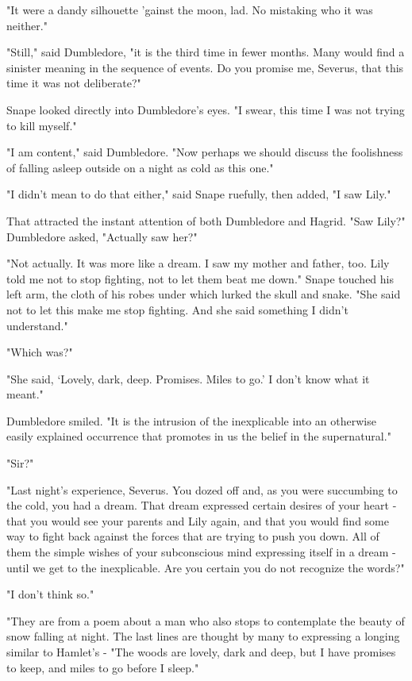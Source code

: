\documentclass[a4paper,11pt]{article}
\begin{document}
"It were a dandy silhouette 'gainst the moon, lad. No mistaking who it was neither."

"Still," said Dumbledore, "it is the third time in fewer months. Many would find a sinister meaning in the sequence of events. Do you promise me, Severus, that this time it was not deliberate?"

Snape looked directly into Dumbledore's eyes. "I swear, this time I was not trying to kill myself."

"I am content," said Dumbledore. "Now perhaps we should discuss the foolishness of falling asleep outside on a night as cold as this one."

"I didn't mean to do that either," said Snape ruefully, then added, "I saw Lily."

That attracted the instant attention of both Dumbledore and Hagrid. "Saw Lily?" Dumbledore asked, "Actually saw her?"

"Not actually. It was more like a dream. I saw my mother and father, too. Lily told me not to stop fighting, not to let them beat me down." Snape touched his left arm, the cloth of his robes under which lurked the skull and snake. "She said not to let this make me stop fighting. And she said something I didn't understand."

"Which was?"

"She said, `Lovely, dark, deep. Promises. Miles to go.' I don't know what it meant."

Dumbledore smiled. "It is the intrusion of the inexplicable into an otherwise easily explained occurrence that promotes in us the belief in the supernatural."

"Sir?"

"Last night's experience, Severus. You dozed off and, as you were succumbing to the cold, you had a dream. That dream expressed certain desires of your heart - that you would see your parents and Lily again, and that you would find some way to fight back against the forces that are trying to push you down. All of them the simple wishes of your subconscious mind expressing itself in a dream - until we get to the inexplicable. Are you certain you do not recognize the words?"

"I don't think so."

"They are from a poem about a man who also stops to contemplate the beauty of snow falling at night. The last lines are thought by many to expressing a longing similar to Hamlet's - "The woods are lovely, dark and deep, but I have promises to keep, and miles to go before I sleep."
\end{document}
